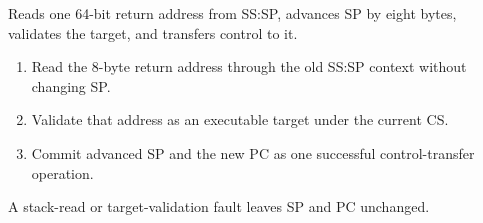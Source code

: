 Reads one 64-bit return address from SS:SP, advances SP by eight bytes, validates the target, and transfers control to it.

\begin{enumerate}
\item Read the 8-byte return address through the old SS:SP context without changing SP.
\item Validate that address as an executable target under the current CS.
\item Commit advanced SP and the new PC as one successful control-transfer operation.
\end{enumerate}

A stack-read or target-validation fault leaves SP and PC unchanged.
